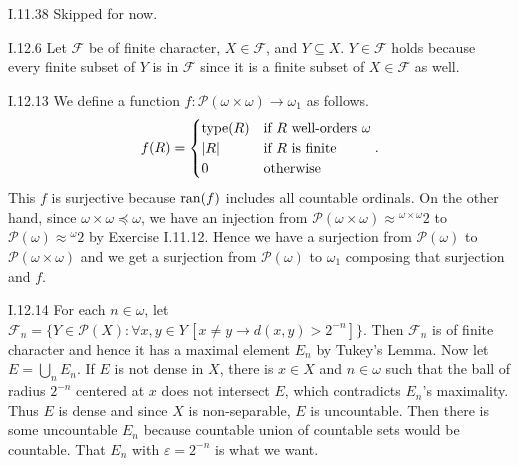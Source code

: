 \documentclass[12pt]{article}
\begin{document}
\begin{customthm}{I.11.38}
  Skipped for now.
\end{customthm}

\begin{customthm}{I.12.6}
  Let $\mathcal{F}$ be of finite character, $X\in\mathcal{F}$, and $Y\subseteq X$. $Y\in\mathcal{F}$ holds because every finite subset of $Y$ is in $\mathcal{F}$ since it is a finite subset of $X\in\mathcal{F}$ as well.
\end{customthm}

\begin{customthm}{I.12.13}
  We define a function $f:\mathcal{P}(\omega\times\omega)\rightarrow\omega_1$ as follows.
  \[
    f(R)=
    \begin{cases}
      \mathop{\mathrm{type}}(R) & \text{if } R \text{ well-orders } \omega \\
      |R| & \text{if } R \text{ is finite} \\
      0 & \text{otherwise}
    \end{cases}.
  \]
  This $f$ is surjective because $\mathop{\mathrm{ran}}(f)$ includes all countable ordinals. On the other hand, since $\omega\times\omega\preccurlyeq\omega$, we have an injection from $\mathcal{P}(\omega\times\omega)\approx {}^{\omega\times\omega}2$ to $\mathcal{P}(\omega)\approx {}^\omega 2$ by Exercise I.11.12. Hence we have a surjection from $\mathcal{P}(\omega)$ to $\mathcal{P}(\omega\times\omega)$ and we get a surjection from $\mathcal{P}(\omega)$ to $\omega_1$ composing that surjection and $f$.
\end{customthm}

\begin{customthm}{I.12.14}
  For each $n\in\omega$, let $\mathcal{F}_n=\{Y\in\mathcal{P}(X):\forall x,y\in Y\,[x\neq y\rightarrow d(x,y)>2^{-n}]\}$. Then $\mathcal{F}_n$ is of finite character and hence it has a maximal element $E_n$ by Tukey's Lemma. Now let $E=\bigcup_n E_n$. If $E$ is not dense in $X$, there is $x\in X$ and $n\in\omega$ such that the ball of radius $2^{-n}$ centered at $x$ does not intersect $E$, which contradicts $E_n$'s maximality. Thus $E$ is dense and since $X$ is non-separable, $E$ is uncountable. Then there is some uncountable $E_n$ because countable union of countable sets would be countable. That $E_n$ with $\varepsilon=2^{-n}$ is what we want.
\end{customthm}
\end{document}
